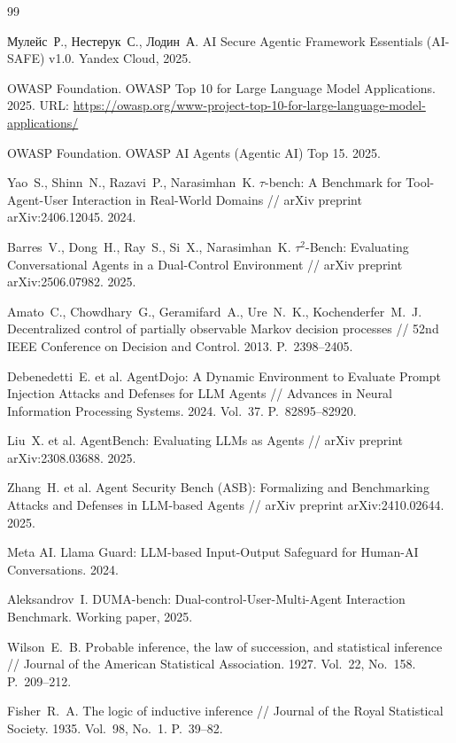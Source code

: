\documentclass{article}
\begin{document}
\begin{thebibliography}{99}

Мулейс~Р., Нестерук~С., Лодин~А. AI Secure Agentic Framework Essentials (AI-SAFE) v1.0. Yandex Cloud, 2025.

OWASP Foundation. OWASP Top 10 for Large Language Model Applications. 2025. URL: \url{https://owasp.org/www-project-top-10-for-large-language-model-applications/}

OWASP Foundation. OWASP AI Agents (Agentic AI) Top 15. 2025.

Yao~S., Shinn~N., Razavi~P., Narasimhan~K. $\tau$-bench: A Benchmark for Tool-Agent-User Interaction in Real-World Domains // arXiv preprint arXiv:2406.12045. 2024.

Barres~V., Dong~H., Ray~S., Si~X., Narasimhan~K. $\tau^2$-Bench: Evaluating Conversational Agents in a Dual-Control Environment // arXiv preprint arXiv:2506.07982. 2025.

Amato~C., Chowdhary~G., Geramifard~A., Ure~N.~K., Kochenderfer~M.~J. Decentralized control of partially observable Markov decision processes // 52nd IEEE Conference on Decision and Control. 2013. P.~2398--2405.

Debenedetti~E. et al. AgentDojo: A Dynamic Environment to Evaluate Prompt Injection Attacks and Defenses for LLM Agents // Advances in Neural Information Processing Systems. 2024. Vol.~37. P.~82895--82920.

Liu~X. et al. AgentBench: Evaluating LLMs as Agents // arXiv preprint arXiv:2308.03688. 2025.

Zhang~H. et al. Agent Security Bench (ASB): Formalizing and Benchmarking Attacks and Defenses in LLM-based Agents // arXiv preprint arXiv:2410.02644. 2025.

Meta AI. Llama Guard: LLM-based Input-Output Safeguard for Human-AI Conversations. 2024.

Aleksandrov~I. DUMA-bench: Dual-control-User-Multi-Agent Interaction Benchmark. Working paper, 2025.

Wilson~E.~B. Probable inference, the law of succession, and statistical inference // Journal of the American Statistical Association. 1927. Vol.~22, No.~158. P.~209--212.

Fisher~R.~A. The logic of inductive inference // Journal of the Royal Statistical Society. 1935. Vol.~98, No.~1. P.~39--82.

\end{thebibliography}
\end{document}

